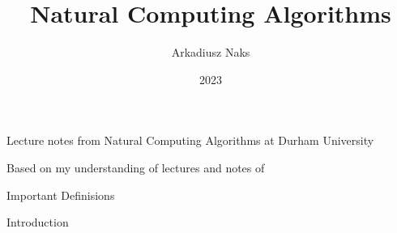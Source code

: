 \documentclass[12pt, letterpaper]{article}
\title{Natural Computing Algorithms }
\author{Arkadiusz Naks}
\date{2023}
\begin{document}
\begin{titlepage}
  \begin{center}
    \makeatletter
    \vspace*{1cm}
    \Huge
    \textbf{\@title}

    \vspace{0.5cm}
    \Large
    Lecture notes from Natural Computing Algorithms at Durham University

    \vspace{1.5cm}

    \textbf{\@author}

    \vfill

    \vspace{0.8cm}

    \small
    Based on my understanding of lectures and notes of \\
    \@date{}
  \end{center}
\end{titlepage}

\tableofcontents
\newpage

\begin{section}{Important Definisions}

\end{section}

\begin{section}{Introduction}

\end{section}
\end{document}
